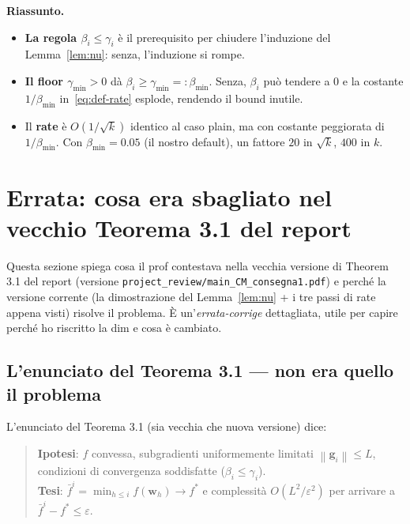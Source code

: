 \documentclass[11pt,a4paper]{article}
\newcommand{\norm}[1]{\left\|#1\right\|}
\newcommand{\bw}{\mathbf{w}}
\newcommand{\bg}{\mathbf{g}}
\theoremstyle{definition}
\begin{document}
\begin{tcolorbox}[intuition]
\textbf{Riassunto.}
\begin{itemize}[leftmargin=*]
\item \textbf{La regola $\beta_i\le\gamma_i$} è il prerequisito per chiudere l'induzione del Lemma~\ref{lem:nu}: senza, l'induzione si rompe.
\item \textbf{Il floor $\gamma_{\min}>0$} dà $\beta_i\ge\gamma_{\min}=:\beta_{\min}$. Senza, $\beta_i$ può tendere a $0$ e la costante $1/\beta_{\min}$ in~\eqref{eq:def-rate} esplode, rendendo il bound inutile.
\item Il \textbf{rate} è $O(1/\sqrt{k})$ identico al caso plain, ma con costante peggiorata di $1/\beta_{\min}$. Con $\beta_{\min}=0.05$ (il nostro default), un fattore $20$ in $\sqrt{k}$, $400$ in $k$.
\end{itemize}
\end{tcolorbox}

\section{Errata: cosa era sbagliato nel vecchio Teorema 3.1 del report}
\label{sec:errata-thm}

Questa sezione spiega cosa il prof contestava nella vecchia versione di Theorem 3.1 del report (versione \texttt{project\_review/main\_CM\_consegna1.pdf}) e perché la versione corrente (la dimostrazione del Lemma~\ref{lem:nu} + i tre passi di rate appena visti) risolve il problema. È un'\emph{errata-corrige} dettagliata, utile per capire perché ho riscritto la dim e cosa è cambiato.

\subsection{L'enunciato del Teorema 3.1 — non era quello il problema}

L'enunciato del Teorema 3.1 (sia vecchia che nuova versione) dice:

\begin{quote}
\textbf{Ipotesi}: $f$ convessa, subgradienti uniformemente limitati $\norm{\bg_i}\le L$, condizioni di convergenza soddisfatte ($\beta_i\le\gamma_i$). \\
\textbf{Tesi}: $\bar f^i = \min_{h\le i} f(\bw_h) \to f^*$ e complessità $O(L^2/\varepsilon^2)$ per arrivare a $\bar f^i - f^* \le \varepsilon$.
\end{quote}
\end{document}
